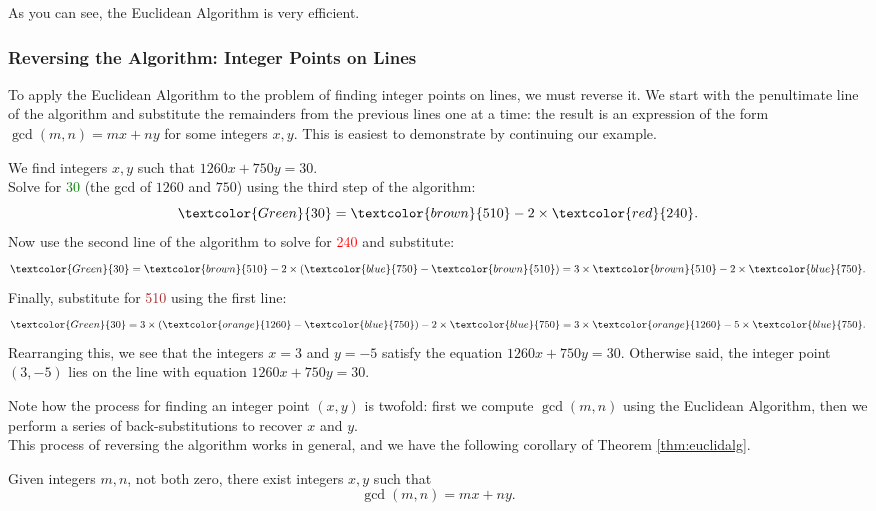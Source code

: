 \noindent As you can see, the Euclidean Algorithm is very efficient.

\subsubsection*{Reversing the Algorithm: Integer Points on Lines}

To apply the Euclidean Algorithm to the problem of finding integer points on lines, we must reverse it. We start with the penultimate line of the algorithm and substitute the remainders from the previous lines one at a time: the result is an expression of the form $\gcd(m,n)=mx+ny$ for some integers $x,y$. This is easiest to demonstrate by continuing our example.

\begin{example}[continued]
We find integers $x,y$ such that $1260x+750y=30$.\\[5pt]
Solve for \textcolor{Green}{30} (the gcd of $1260$ and $750$) using the third step of the algorithm:
\[\textcolor{Green}{30}=\textcolor{brown}{510}-2\times\textcolor{red}{240}.\]
Now use the second line of the algorithm to solve for \textcolor{red}{240} and substitute:
\[\textcolor{Green}{30}=\textcolor{brown}{510}-2\times (\textcolor{blue}{750}-\textcolor{brown}{510})=3\times \textcolor{brown}{510}-2\times \textcolor{blue}{750}.\]
Finally, substitute for \textcolor{brown}{510} using the first line:
\[\textcolor{Green}{30}=3\times (\textcolor{orange}{1260}-\textcolor{blue}{750})-2\times \textcolor{blue}{750}=3\times \textcolor{orange}{1260}-5\times \textcolor{blue}{750}.\]
Rearranging this, we see that the integers $x=3$ and $y=-5$ satisfy the equation $1260x+750y=30$. Otherwise said, the integer point $(3,-5)$ lies on the line with equation $1260x+750y=30$.
\end{example}

\noindent Note how the process for finding an integer point $(x,y)$ is twofold: first we compute $\gcd(m,n)$ using the Euclidean Algorithm, then we perform a series of back-substitutions to recover $x$ and $y$.\\

\noindent This process of reversing the algorithm works in general, and we have the following corollary of Theorem \ref{thm:euclidalg}.

\begin{cor}\label{cor:euclid}
Given integers $m,n$, not both zero, there exist integers $x,y$ such that
\[\gcd(m,n)=mx+ny.\]
\end{cor}

